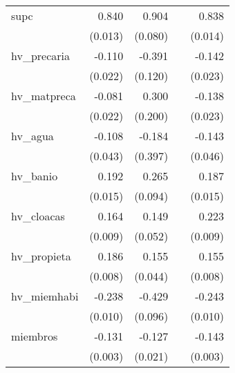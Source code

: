 {\begin{longtable}{l*{4}{D{.}{.}{-1}}}
\addlinespace
supc        &       0.840\sym{***}&       0.904\sym{***}&                     &       0.838\sym{***}\\
            &     (0.013)         &     (0.080)         &                     &     (0.014)         \\
\addlinespace
hv\_precaria &      -0.110\sym{***}&      -0.391\sym{**} &                     &      -0.142\sym{***}\\
            &     (0.022)         &     (0.120)         &                     &     (0.023)         \\
\addlinespace
hv\_matpreca &      -0.081\sym{***}&       0.300         &                     &      -0.138\sym{***}\\
            &     (0.022)         &     (0.200)         &                     &     (0.023)         \\
\addlinespace
hv\_agua     &      -0.108\sym{*}  &      -0.184         &                     &      -0.143\sym{**} \\
            &     (0.043)         &     (0.397)         &                     &     (0.046)         \\
\addlinespace
hv\_banio    &       0.192\sym{***}&       0.265\sym{**} &                     &       0.187\sym{***}\\
            &     (0.015)         &     (0.094)         &                     &     (0.015)         \\
\addlinespace
hv\_cloacas  &       0.164\sym{***}&       0.149\sym{**} &                     &       0.223\sym{***}\\
            &     (0.009)         &     (0.052)         &                     &     (0.009)         \\
\addlinespace
hv\_propieta &       0.186\sym{***}&       0.155\sym{***}&                     &       0.155\sym{***}\\
            &     (0.008)         &     (0.044)         &                     &     (0.008)         \\
\addlinespace
hv\_miemhabi &      -0.238\sym{***}&      -0.429\sym{***}&                     &      -0.243\sym{***}\\
            &     (0.010)         &     (0.096)         &                     &     (0.010)         \\
\addlinespace
miembros    &      -0.131\sym{***}&      -0.127\sym{***}&                     &      -0.143\sym{***}\\
            &     (0.003)         &     (0.021)         &                     &     (0.003)         \\

\end{longtable}}
